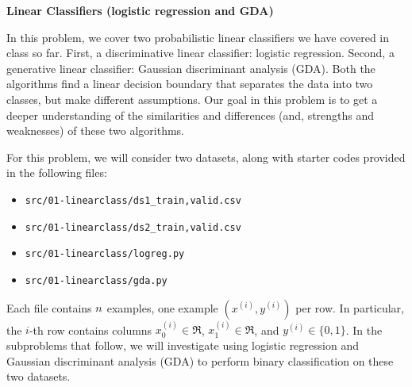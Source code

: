 \item {\bf Linear Classifiers (logistic regression and GDA)}

In this problem, we cover two probabilistic linear classifiers we have covered in class so far. First, a discriminative linear classifier: logistic regression. Second, a generative linear classifier: Gaussian discriminant analysis (GDA). Both the algorithms find a linear decision boundary that separates the data into two classes, but make different assumptions. Our goal in this problem is to get a deeper understanding of the similarities and differences (and, strengths and weaknesses) of these two algorithms.

For this problem, we will consider two datasets, along with starter codes provided in the following files:
\begin{center}
\begin{itemize}
	\item \texttt{src/01-linearclass/ds1\_{train,valid}.csv}
	\item \texttt{src/01-linearclass/ds2\_{train,valid}.csv}
        \item \texttt{src/01-linearclass/logreg.py}
        \item \texttt{src/01-linearclass/gda.py}
\end{itemize}
\end{center}
Each file contains ${n}$ examples, one example $(x^{(i)}, y^{(i)})$ per row. In particular, the $i$-th row contains columns $x^{(i)}_0\in\Re$, $x^{(i)}_1\in\Re$, and $y^{(i)}\in\{0, 1\}$. In the subproblems that follow, we will investigate using logistic regression and Gaussian discriminant analysis (GDA) to perform binary classification on these two datasets.

\begin{enumerate}
	
	
	
	
	
	
	
	
\end{enumerate}
